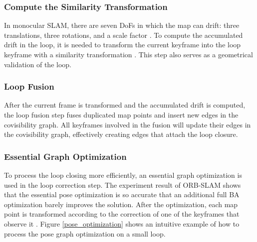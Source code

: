 \documentclass[letterpaper, 10 pt, conference]{ieeeconf}  %
\begin{document}
\subsubsection{Compute the Similarity Transformation}
In monocular SLAM, there are seven DoFs in which the map can drift: three translations, three rotations, and a scale factor \cite{6}. To compute the accumulated drift in the loop, it is needed to transform the current keyframe into the loop keyframe with a similarity transformation \cite{42}. This step also serves as a geometrical validation of the loop.

\subsubsection{Loop Fusion}
After the current frame is transformed and the accumulated drift is computed, the loop fusion step fuses duplicated map points and insert new edges in the covisibility graph. All keyframes involved in the fusion will update their edges in the covisibility graph, effectively creating edges that attach the loop closure.

\subsubsection{Essential Graph Optimization}
To process the loop closing more efficiently, an essential graph optimization is used in the loop correction step. The experiment result of ORB-SLAM shows that the essential pose optimization is so accurate that an additional full BA optimization barely improves the solution. After the optimization, each map point is transformed according to the correction of one of the keyframes that observe it \cite{6}. Figure \ref{pose_optimization} shows an intuitive example of how to process the pose graph optimization on a small loop.
\end{document}
